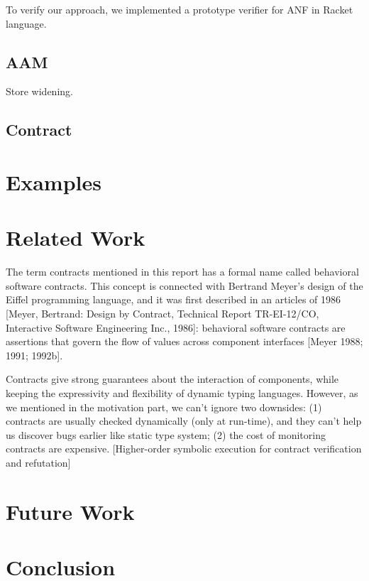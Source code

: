 \documentclass[paper=a4, fontsize=11pt]{scrartcl} %
\numberwithin{equation}{section} %
\numberwithin{figure}{section} %
\numberwithin{table}{section} %
\begin{document}
To verify our approach, we implemented a prototype verifier for ANF in Racket language.

\subsection{AAM}
Store widening.

\subsection{Contract}


\section{Examples}


\section{Related Work}
The term contracts mentioned in this report has a formal name called behavioral software contracts. This concept is connected with Bertrand Meyer's design of the Eiffel programming language, and it was first described in an articles of 1986 [Meyer, Bertrand: Design by Contract, Technical Report TR-EI-12/CO, Interactive Software Engineering Inc., 1986]: behavioral software contracts are assertions that govern the flow of values across component interfaces [Meyer 1988; 1991; 1992b].

Contracts give strong guarantees about the interaction of components, while keeping the expressivity and flexibility of dynamic typing languages. However, as we mentioned in the motivation part, we can't ignore two downsides: (1) contracts are usually checked dynamically (only at run-time), and they can't help us discover bugs earlier like static type system; (2) the cost of monitoring contracts are expensive. [Higher-order symbolic execution for contract verification and refutation]



\section{Future Work}

\section{Conclusion}
\end{document}
